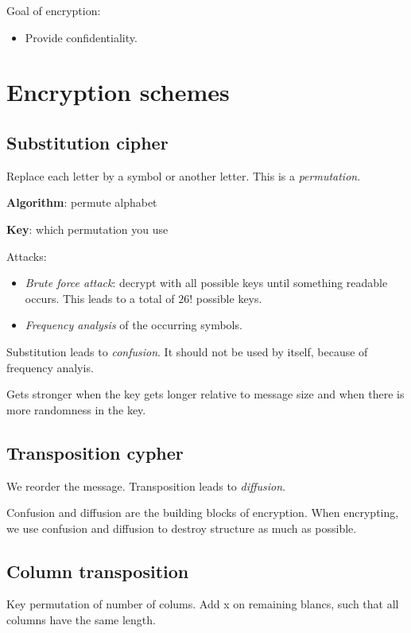 \documentclass[language=english,number=]{homework}
\author{Sophie van den Eerenbeemt\\0954445}
\date{\today}
\begin{document}
\maketitlepage

Goal of encryption:
\begin{itemize}
\item Provide confidentiality.
\end{itemize}

\section{Encryption schemes}

\subsection{Substitution cipher}

Replace each letter by a symbol or another letter.
This is a \textit{permutation}.

\textbf{Algorithm}: permute alphabet

\textbf{Key}: which permutation you use

Attacks:
\begin{itemize}
\item \textit{Brute force attack}: decrypt with all possible keys until something readable occurs.
This leads to a total of $26!$ possible keys.
\item \textit{Frequency analysis} of the occurring symbols.
\end{itemize}

Substitution leads to \textit{confusion}.
It should not be used by itself, because of frequency analyis.

Gets stronger when the key gets longer relative to message size and when there is more randomness in the key.

\subsection{Transposition cypher}

We reorder the message.
Transposition leads to \textit{diffusion}.

Confusion and diffusion are the building blocks of encryption.
When encrypting, we use confusion and diffusion to destroy structure as much as possible.

\subsection{Column transposition}

Key permutation of number of colums.
Add x on remaining blancs, such that all columns have the same length.
\end{document}
